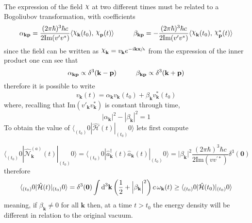 The expression of the field $\rchi$ at two different times must be related to a Bogoliubov transformation, with coefficients
\begin{equation}
	\alpha_{\mathbf{kp}}=\frac{(2\pi\hbar)^3\hbar c}{2\text{Im}(v'v^*)}\langle \rchi_\mathbf{k}(t_0),\,\rchi_\mathbf{p}(t)\rangle\hspace{1.0cm}\beta_{\mathbf{kp}}=-\frac{(2\pi\hbar)^3\hbar c}{2\text{Im}(v'v^*)}\langle \rchi_\mathbf{k}(t_0),\,\rchi_\mathbf{p}^*(t)\rangle
\end{equation}
since the field can be written as $\rchi_\mathbf{k}=v_\mathbf{k}e^{-i\mathbf{kx}\sfrac{}{h}}$ from the expression of the inner product one can see that
\begin{equation}
	\alpha_{\mathbf{kp}}\propto \delta^3(\mathbf{k}-\mathbf{p})\hspace{1.0cm}\beta_{\mathbf{kp}}\propto \delta^3(\mathbf{k}+\mathbf{p})
\end{equation}
therefore it is possible to write
\begin{equation}
	v_\mathbf{k}(t)=\alpha_\mathbf{k}v_\mathbf{k}(t_0)+\beta_\mathbf{k}v^*_\mathbf{k}(t_0)
\end{equation}
where, recalling that $\text{Im}(v'_\mathbf{k}v^*_\mathbf{k})$ is constant through time, 
\begin{equation}
	|\alpha_\mathbf{k}|^2-|\beta_\mathbf{k}|^2=1
\end{equation}
To obtain the value of $\langle_{(t_0)}0|\hat{\mathcal{H}}(t)|_{(t_0)}0\rangle$ lets first compute


\begin{equation}
	\langle_{(t_0)}0|\hat{\mathcal{N}}_\mathbf{k}^{(a)}(t)|_{(t_0)}0\rangle=\langle_{(t_0)}0|\hat{a}^\dagger_\mathbf{k}(t)\hat{a}_\mathbf{k}(t)|_{(t_0)}0\rangle=\Big|\beta_\mathbf{k}\Big|^2\frac{(2\pi\hbar)^3\hbar c}{2\text{Im}(vv^{'*})}\delta^3(\mathbf{0})
\end{equation}
therefore
\begin{equation}
	\langle_{(t_0)}0|\hat{\mathcal{H}}(t)|_{(t_0)}0\rangle=\delta^3(\mathbf{0})\int\text{d}^3\mathbf{k}\left(\frac{1}{2}+\Big|\beta_\mathbf{k}\Big|^2\right)c\,\omega_\mathbf{k}(t)\geq \langle_{(t_0)}0|\hat{\mathcal{H}}(t_0)|_{(t_0)}0\rangle
\end{equation}
meaning, if $\beta_\mathbf{k}\not=0$ for all $\mathbf{k}$ then, at a time $t>t_0$ the energy density will be different in relation to the original vacuum.